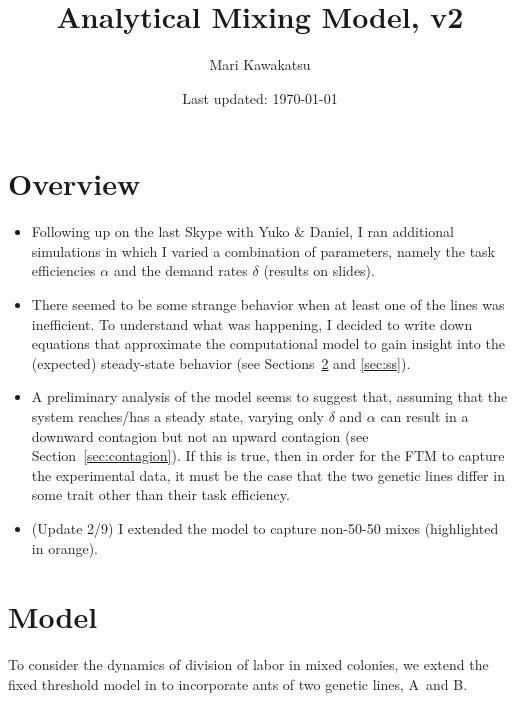 \documentclass[10pt]{article}
\title{\vspace{-30pt}\Large Analytical Mixing Model, v2\vspace{-10pt}}
\author{Mari Kawakatsu\vspace{-15pt}}
\date{Last updated: \today\vspace{-15pt}}
\newcommand{\A}{{\color{red}A}}
\newcommand{\B}{{\color{blue}B}}
\begin{document}
\maketitle

\tableofcontents

\section{Overview}
\begin{itemize}
    \item Following up on the last Skype with Yuko \& Daniel, I ran additional simulations in which I varied a combination of parameters, namely the task efficiencies $\alpha$ and the demand rates $\delta$ (results on slides).
    
    \item There seemed to be some strange behavior when at least one of the lines was inefficient. To understand what was happening, I decided to write down equations that approximate the computational model to gain insight into the (expected) steady-state behavior (see Sections~\ref{sec:model} and \ref{sec:ss}).
    
    \item A preliminary analysis of the model seems to suggest that, assuming that the system reaches/has a steady state, varying only $\delta$ and $\alpha$ can result in a downward contagion but not an upward contagion (see Section~\ref{sec:contagion}). If this is true, then in order for the FTM to capture the experimental data, it must be the case that the two genetic lines differ in some trait other than their task efficiency.
    
    \item (Update 2/9) I extended the model to capture non-50-50 mixes (highlighted in {\color{orange}orange}).
    
\end{itemize}

\section{Model} \label{sec:model}

To consider the dynamics of division of labor in mixed colonies, we extend the fixed threshold model in \cite{ulrich18} to incorporate ants of two genetic lines, \A\ and \B. 
\end{document}
